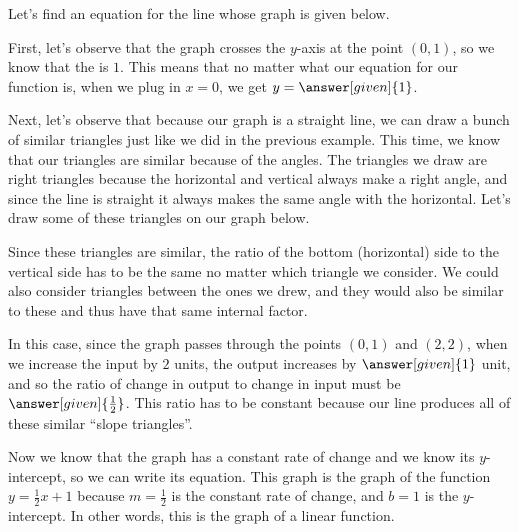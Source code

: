 \documentclass{ximera}
\begin{document}
\begin{example}
Let's find an equation for the line whose graph is given below.
\begin{image}
\end{image}
First, let's observe that the graph crosses the $y$-axis at the point $(0,1)$, so we know that the  is $1$. This means that no matter what our equation for our function is, when we plug in $x=0$, we get $y= \answer[given]{1}$. 

Next, let's observe that because our graph is a straight line, we can draw a bunch of similar triangles just like we did in the previous example. This time, we know that our triangles are similar because of the angles. The triangles we draw are right triangles because the horizontal and vertical always make a right angle, and since the line is straight it always makes the same angle with the horizontal. Let's draw some of these triangles on our graph below.
\begin{image}
\end{image}
Since these triangles are similar, the ratio of the bottom (horizontal) side to the vertical side has to be the same no matter which triangle we consider. We could also consider triangles between the ones we drew, and they would also be similar to these and thus have that same internal factor.

In this case, since the graph passes through the points $(0,1)$ and $(2,2)$, when we increase the input by $2$ units, the output increases by $\answer[given]{1}$ unit, and so the ratio of change in output to change in input must be $\answer[given]{\frac{1}{2}}$. This ratio has to be constant because our line produces all of these similar ``slope triangles''. 

Now we know that the graph has a constant rate of change and we know its $y$-intercept, so we can write its equation. This graph is the graph of the function $y= \frac{1}{2} x + 1$ because $m=\frac12$ is the constant rate of change, and $b=1$ is the $y$-intercept. In other words, this is the graph of a linear function.

\end{example}
\end{document}
